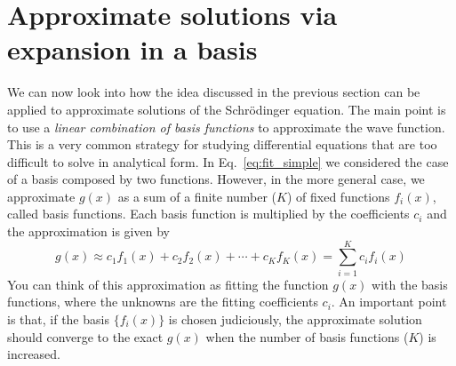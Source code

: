 \documentclass[../Main/chem371-notes.tex]{subfiles}
\begin{document}
\section{Approximate solutions via expansion in a basis}
We can now look into how the idea discussed in the previous section can be applied to approximate solutions of the Schr\"{o}dinger equation.
The main point is to use a \emph{linear combination of basis functions} to approximate the wave function.
This is a very common strategy for studying differential equations that are too difficult to solve in analytical form.
In Eq.~\eqref{eq:fit_simple} we considered the case of a basis composed by two functions.
However, in the more general case, we approximate $g(x)$ as a sum of a finite number ($K$) of fixed functions $f_i(x)$, called basis functions.
Each basis function is multiplied by the coefficients $c_i$ and the approximation is given by
\begin{equation}
g(x) \approx  c_1 f_1(x) +  c_2 f_2(x) + \cdots + c_K f_K(x) = \sum_{i=1}^{K} c_i f_i(x) 
\end{equation}
You can think of this approximation as fitting the function $g(x)$ with the basis functions, where the unknowns are the fitting coefficients $c_i$.
An important point is that, if the basis $\{ f_i(x) \}$ is chosen judiciously, the approximate solution should converge to the exact $g(x)$ when the number of basis functions ($K$) is increased.
\end{document}
